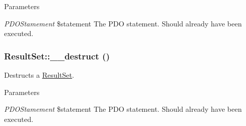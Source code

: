 \begin{DoxyParams}{Parameters}
\item[{\em PDOStamement}]\$statement The PDO statement. Should already have been executed. \end{DoxyParams}
\hypertarget{classResultSet_a01538a6f9a53136f188d44b85b4835cd}{
\subsubsection[{\_\-\_\-destruct}]{\setlength{\rightskip}{0pt plus 5cm}ResultSet::\_\-\_\-destruct ()}}
\label{classResultSet_a01538a6f9a53136f188d44b85b4835cd}
Destructs a \hyperlink{classResultSet}{ResultSet}.


\begin{DoxyParams}{Parameters}
\item[{\em PDOStamement}]\$statement The PDO statement. Should already have been executed. \end{DoxyParams}


